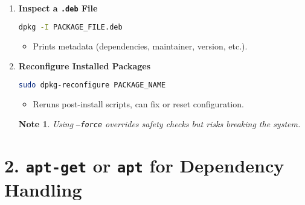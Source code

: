 \documentclass[12pt,a4paper]{report}
\newtheorem*{noteenv}{Note}
\begin{document}
\begin{enumerate}
    \item \textbf{Inspect a \texttt{.deb} File}
    \begin{lstlisting}[language=bash]
dpkg -I PACKAGE_FILE.deb
    \end{lstlisting}
    \begin{itemize}
        \item Prints metadata (dependencies, maintainer, version, etc.).
    \end{itemize}

    \item \textbf{Reconfigure Installed Packages}
    \begin{lstlisting}[language=bash]
sudo dpkg-reconfigure PACKAGE_NAME
    \end{lstlisting}
    \begin{itemize}
        \item Reruns post-install scripts, can fix or reset configuration.
    \end{itemize}

    \begin{noteenv}
        Using \texttt{--force} overrides safety checks but risks breaking the system.
    \end{noteenv}

\end{enumerate}

\section*{2. \texttt{apt-get} or \texttt{apt} for Dependency Handling}
\end{document}
